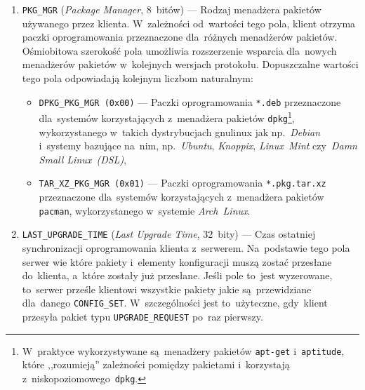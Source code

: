 \documentclass[thesis]{subfiles}
\begin{document}
\begin{enumerate}
	\item \texttt{PKG\_MGR} (\emph{Package Manager}, 8~bitów) --- Rodzaj menadżera pakietów używanego przez klienta. W~zależności od~wartości tego pola, klient otrzyma paczki oprogramowania przeznaczone dla~różnych menadżerów pakietów. Ośmiobitowa szerokość pola umożliwia rozszerzenie wsparcia dla~nowych menadżerów pakietów w~kolejnych wersjach protokołu. Dopuszczalne wartości tego pola odpowiadają kolejnym liczbom naturalnym:
		\begin{itemize}
			\item \texttt{DPKG\_PKG\_MGR (0x00)} --- Paczki oprogramowania \texttt{*.deb} przeznaczone dla~systemów korzystających z~menadżera pakietów \texttt{dpkg}\footnote{W~praktyce wykorzystywane są~menadżery pakietów \texttt{apt-get} i~\texttt{aptitude}, które ,,rozumieją'' zależności pomiędzy pakietami i~korzystają z~niskopoziomowego~\texttt{dpkg}.}, wykorzystanego w~takich dystrybucjach \gls{gnulinux} jak np.~\emph{Debian} i~systemy bazujące na~nim, np.~\emph{Ubuntu}, \emph{Knoppix}, \emph{Linux~Mint} czy~\emph{Damn Small Linux~(DSL)},
			\item \texttt{TAR\_XZ\_PKG\_MGR (0x01)} --- Paczki oprogramowania \texttt{*.pkg.tar.xz} przeznaczone dla~systemów korzystających z~menadżera pakietów \texttt{pacman}, wykorzystanego w~systemie \emph{Arch~Linux}.
		\end{itemize}
	\item \texttt{LAST\_UPGRADE\_TIME} (\emph{Last Upgrade Time}, 32~bity) --- Czas ostatniej synchronizacji oprogramowania klienta z~serwerem. Na~podstawie tego pola serwer wie które pakiety i~elementy konfiguracji muszą zostać przesłane do~klienta, a~które zostały już przesłane. Jeśli pole to~jest wyzerowane, to~serwer prześle klientowi wszystkie pakiety jakie są~przewidziane dla~danego \texttt{CONFIG\_SET}. W~szczególności jest to~użyteczne, gdy~klient przesyła pakiet typu \texttt{UPGRADE\_REQUEST} po~raz pierwszy.
\end{enumerate}
\end{document}
